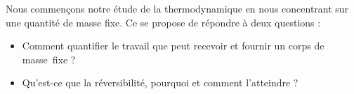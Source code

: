 Nous commençons notre étude de la thermodynamique en nous concentrant sur une quantité de masse fixe. Ce \coursdeux se propose de répondre à deux questions :
\begin{itemize}
	\item Comment quantifier le travail que peut recevoir et fournir un corps de masse~fixe ?
	\item Qu’est-ce que la réversibilité, pourquoi et comment l’atteindre ?
\end{itemize}
